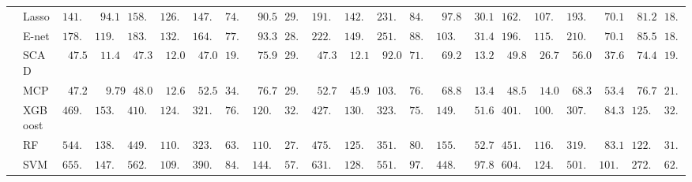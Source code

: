 \begin{tabular}{ll|ll|llllll|llllll|llllll}
 & Lasso  & $141.66$ & $\phantom{0}94.14$ & $158.24$ & $126.14$ & $147.04$ & $74.76$ & $\phantom{0}90.58$ & $29.17$ & $191.58$ & $142.86$ & $231.54$ & $84.58$ & $\phantom{0}97.80$ & $\phantom{0}30.12$ & $162.51$ & $107.79$ & $193.95$ & $\phantom{0}70.18$ & $\phantom{0}81.23$ & $18.30$ \\
 & E-net  & $178.00$ & $119.95$ & $183.44$ & $132.80$ & $164.64$ & $77.22$ & $\phantom{0}93.33$ & $28.07$ & $222.48$ & $149.93$ & $251.66$ & $88.64$ & $103.37$ & $\phantom{0}31.48$ & $196.43$ & $115.53$ & $210.21$ & $\phantom{0}70.10$ & $\phantom{0}85.55$ & $18.46$ \\
 & SCAD  & $\phantom{0}47.50$ & $\phantom{0}11.43$ & $\phantom{0}47.32$ & $\phantom{0}12.04$ & $\phantom{0}47.03$ & $19.41$ & $\phantom{0}75.91$ & $29.87$ & $\phantom{0}47.31$ & $\phantom{0}12.16$ & $\phantom{0}92.09$ & $71.01$ & $\phantom{0}69.25$ & $\phantom{0}13.26$ & $\phantom{0}49.83$ & $\phantom{0}26.73$ & $\phantom{0}56.09$ & $\phantom{0}37.62$ & $\phantom{0}74.47$ & $19.45$ \\
 & MCP  & $\phantom{0}47.24$ & $\phantom{00}9.79$ & $\phantom{0}48.09$ & $\phantom{0}12.66$ & $\phantom{0}52.55$ & $34.03$ & $\phantom{0}76.73$ & $29.56$ & $\phantom{0}52.76$ & $\phantom{0}45.99$ & $103.71$ & $76.00$ & $\phantom{0}68.85$ & $\phantom{0}13.43$ & $\phantom{0}48.56$ & $\phantom{0}14.01$ & $\phantom{0}68.31$ & $\phantom{0}53.44$ & $\phantom{0}76.72$ & $21.48$ \\
 & XGBoost  & $469.79$ & $153.10$ & $410.24$ & $124.20$ & $321.26$ & $76.75$ & $120.60$ & $32.85$ & $427.40$ & $130.84$ & $323.66$ & $75.19$ & $149.85$ & $\phantom{0}51.63$ & $401.51$ & $100.54$ & $307.25$ & $\phantom{0}84.34$ & $125.67$ & $32.82$ \\
 & RF  & $544.40$ & $138.21$ & $449.51$ & $110.71$ & $323.89$ & $63.22$ & $110.63$ & $27.86$ & $475.33$ & $125.96$ & $351.50$ & $80.88$ & $155.18$ & $\phantom{0}52.79$ & $451.61$ & $116.15$ & $319.99$ & $\phantom{0}83.11$ & $122.12$ & $31.12$ \\
 & SVM  & $655.31$ & $147.70$ & $562.14$ & $109.84$ & $390.52$ & $84.30$ & $144.29$ & $57.22$ & $631.61$ & $128.77$ & $551.01$ & $97.28$ & $448.94$ & $\phantom{0}97.82$ & $604.68$ & $124.27$ & $501.74$ & $101.37$ & $272.56$ & $62.96$ \\
\hline 
\end{tabular}

